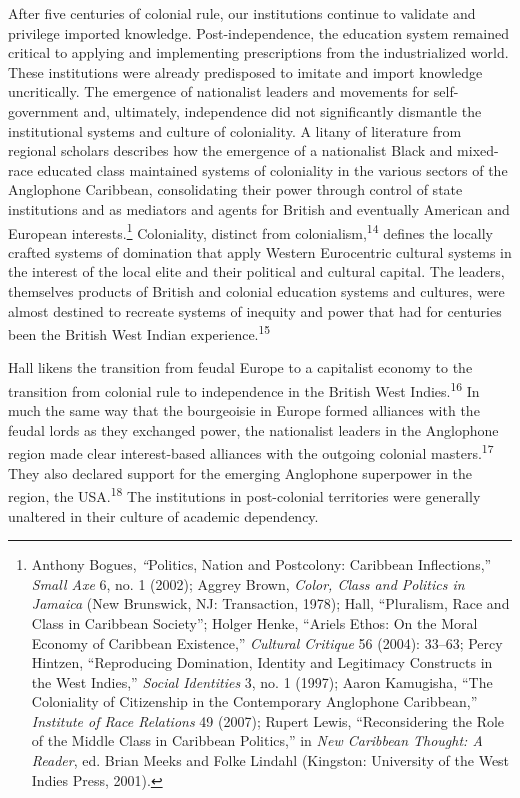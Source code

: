\documentclass{tufte-handout}
\begin{document}
After five centuries of colonial rule, our institutions continue to
validate and privilege imported knowledge. Post-independence, the
education system remained critical to applying and implementing
prescriptions from the industrialized world. These institutions were
already predisposed to imitate and import knowledge uncritically. The
emergence of nationalist leaders and movements for self-government and,
ultimately, independence did not significantly dismantle the
institutional systems and culture of coloniality. A litany of literature
from regional scholars describes how the emergence of a nationalist
Black and mixed-race educated class maintained systems of coloniality in
the various sectors of the Anglophone Caribbean, consolidating their
power through control of state institutions and as mediators and agents
for British and eventually American and European interests.\footnote{Anthony
  Bogues, \emph{``}Politics, Nation and Postcolony: Caribbean
  Inflections,'' \emph{Small Axe} 6, no. 1 (2002); Aggrey Brown,
  \emph{Color, Class and Politics in Jamaica} (New Brunswick, NJ:
  Transaction, 1978); Hall, ``Pluralism, Race and Class in Caribbean
  Society''; Holger Henke, ``Ariel\textquotesingle s Ethos: On the Moral
  Economy of Caribbean Existence,'' \emph{Cultural Critique} 56 (2004):
  33--63; Percy Hintzen, ``Reproducing Domination, Identity and
  Legitimacy Constructs in the West Indies,'' \emph{Social Identities}
  3, no. 1 (1997); Aaron Kamugisha, ``The Coloniality of Citizenship in
  the Contemporary Anglophone Caribbean,'' \emph{Institute of Race
  Relations} 49 (2007); Rupert Lewis, ``Reconsidering the Role of the
  Middle Class in Caribbean Politics,'' in \emph{New Caribbean Thought:
  A Reader}, ed. Brian Meeks and Folke Lindahl (Kingston: University of
  the West Indies Press, 2001).} Coloniality, distinct from
colonialism,\textsuperscript{14} defines the locally
crafted systems of domination that apply Western Eurocentric cultural
systems in the interest of the local elite and their political and
cultural capital. The leaders, themselves products of British and
colonial education systems and cultures, were almost destined to
recreate systems of inequity and power that had for centuries been the
British West Indian experience.\textsuperscript{15}

Hall likens the transition from feudal Europe to a capitalist economy to
the transition from colonial rule to independence in the British West
Indies.\textsuperscript{16} In much the same way that the bourgeoisie in Europe
formed alliances with the feudal lords as they exchanged power, the
nationalist leaders in the Anglophone region made clear interest-based
alliances with the outgoing colonial masters.\textsuperscript{17} They
also declared support for the emerging Anglophone superpower in the
region, the USA.\textsuperscript{18} The
institutions in post-colonial territories were generally unaltered in
their culture of academic dependency.
\end{document}
